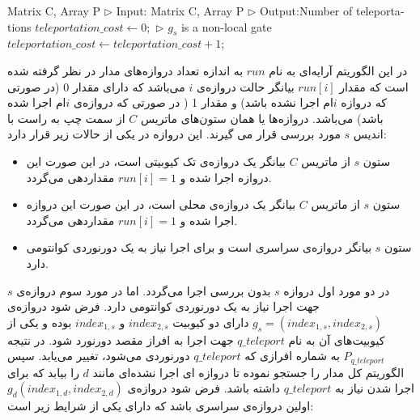 \begin{latin}
\begin{algorithm}
{
\fontsize{9}{1}
\caption{Main algorithm}
\begin{algorithmic}[1]
 {Matrix C, Array P}
\State\textcolor[rgb]{0.00,0.50,1.00}{ $\triangleright$ Input: Matrix C, Array P}
\State\textcolor[rgb]{0.00,0.50,1.00}{ $\triangleright$ Output:Number of teleportations}
\State $teleportation\_cost\leftarrow 0;$
\Else
{} \State\textcolor[rgb]{0.00,0.50,1.00}{ $\triangleright$ $g_{s}$ is a non-local gate}
\State $teleportation\_cost\leftarrow teleportation\_cost+1;$
\EndIf
\EndIf
\EndFor
\EndFunction
\end{algorithmic}
}
\end{algorithm}
\end{latin}



در این الگوریتم آرایه‌ای به نام $run$ به اندازه تعداد دروازه‌های مدار در نظر گرفته شده است که مقدار $run[i]$ بیانگر حالت دروازه‌ی  $i$ می‌باشد که دارای مقدار 0 (در صورتی که دروازه $i$ام اجرا نشده باشد) و مقدار 1 ( در صورتی که دروازه‌ی $i$ام اجرا شده باشد) می‌باشد. دروازه‌ها یا همان ستون‌های ماتریس  $C$ از سمت چپ به راست با اندیس $s$ مورد بررسی قرار می گیرند. این دروازه در یکی از حالات زیر قرار دارد:
\begin{itemize}
\item
ستون $s$ از ماتریس $C$ بیانگر یک دروازه‌ی تک کیوبیتی است، در این صورت این دروازه اجرا شده و $run[i]=1 $ مقداردهی می‌گردد.
\item
ستون $s$ از ماتریس $C$ بیانگر یک دروازه‌ی محلی است، در این صورت این دروازه اجرا شده و $run[i]=1 $ مقداردهی می‌گردد.
\item
ستون $s$ بیانگر دروازه‌ی سراسری است و برای اجرا نیاز به یک دورنوردی کوانتومی دارد.
\end{itemize}
 در دو مورد اول دروازه $s$ بدون بررسی اجرا می‌گردد. اما در مورد سوم دروازه‌ی $s$ جهت اجرا نیاز به یک دورنوردی کوانتومی دارد. فرض شود دروازه‌ی $g_s=(index_{1,s},index_{2,s})$ دارای دو کیوبیت $index_{2,s}$ و $index_{1,s}$ بوده و یکی از کیوبیت‌های آن به نام $q\_teleport$ جهت اجرا به افراز مقصد دورنورد شود. در نتیجه $P_{q\_teleport}$ به شماره افرازی که $q\_teleport$ دورنوردی می‌شود، تغییر می‌یابد. سپس الگوریتم کل مدار را جستجو نموده تا دروازه ای اجرا نشده‌ای مانند $d$ را بیابد که برای اجرا شدن نیاز به $q\_teleport$ داشته باشد. فرض شود دروازه‌ی $g_{d} (index_{1,d},index_{2,d})$ اولین دروازه‌ی سراسری باشد که دارای یکی از شرایط زیر است:


